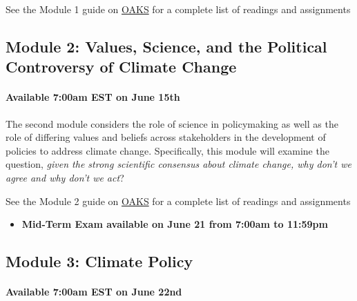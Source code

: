 \vspace{0.1in}

\noindent See the Module 1 guide on \href{https://lms.cofc.edu}{OAKS}
for a complete list of readings and assignments

\hypertarget{module-2-values-science-and-the-political-controversy-of-climate-change}{%
\subsection{Module 2: Values, Science, and the Political Controversy of
Climate
Change}\label{module-2-values-science-and-the-political-controversy-of-climate-change}}

\hypertarget{available-700am-est-on-june-15th}{%
\paragraph{Available 7:00am EST on June
15th}\label{available-700am-est-on-june-15th}}

The second module considers the role of science in policymaking as well
as the role of differing values and beliefs across stakeholders in the
development of policies to address climate change. Specifically, this
module will examine the question, \emph{given the strong scientific
consensus about climate change, why don't we agree and why don't we
act}?

\vspace{0.1in}

\noindent See the Module 2 guide on \href{https://lms.cofc.edu}{OAKS}
for a complete list of readings and assignments

\begin{itemize}

\item
  \textbf{Mid-Term Exam available on June 21 from 7:00am to 11:59pm}
\end{itemize}

\hypertarget{module-3-climate-policy}{%
\subsection{Module 3: Climate Policy}\label{module-3-climate-policy}}

\hypertarget{available-700am-est-on-june-22nd}{%
\paragraph{Available 7:00am EST on June
22nd}\label{available-700am-est-on-june-22nd}}

